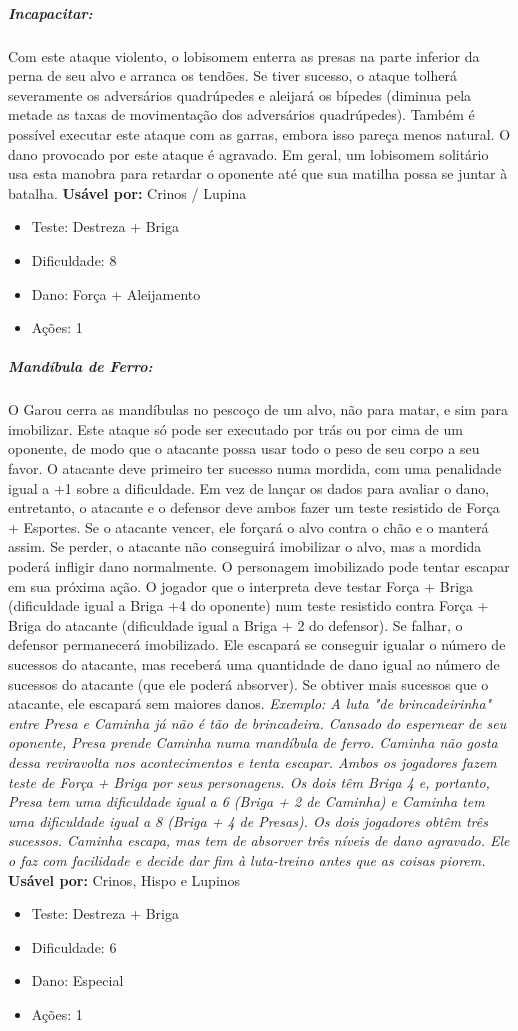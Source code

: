 \subparagraph{\bf Incapacitar:}
Com este ataque violento, o lobisomem enterra as presas na parte inferior da perna de seu alvo e arranca os tendões. Se tiver sucesso, o ataque tolherá severamente os adversários quadrúpedes e aleijará os bípedes (diminua pela metade as taxas de movimentação dos adversários quadrúpedes). Também é possível executar este ataque com as garras, embora isso pareça menos natural.
O dano provocado por este ataque é agravado. Em geral, um lobisomem solitário usa esta manobra para retardar o oponente até que sua matilha possa se juntar à batalha.
{\bf Usável por:} Crinos / Lupina
\begin{itemize}[noitemsep]
\item Teste: Destreza + Briga
\item Dificuldade: 8
\item Dano: Força + Aleijamento
\item Ações: 1
\end{itemize}

\subparagraph{\bf Mandíbula de Ferro:}
O Garou cerra as mandíbulas no pescoço de um alvo, não para matar, e sim para imobilizar. Este ataque só pode ser executado por trás ou por cima de um oponente, de modo que o atacante possa usar todo o peso de seu corpo a seu favor. O atacante deve primeiro ter sucesso numa mordida, com uma penalidade igual a +1 sobre a dificuldade. Em vez de lançar os dados para avaliar o dano, entretanto, o atacante e o defensor deve ambos fazer um teste resistido de Força + Esportes. Se o atacante vencer, ele forçará o alvo contra o chão e o manterá assim. Se perder, o atacante não conseguirá imobilizar o alvo, mas a mordida poderá infligir dano normalmente.
O personagem imobilizado pode tentar escapar em sua próxima ação. O jogador que o interpreta deve testar Força + Briga (dificuldade igual a Briga +4 do oponente) num teste resistido contra Força + Briga do atacante (dificuldade igual a Briga + 2 do defensor). Se falhar, o defensor permanecerá imobilizado. Ele escapará se conseguir igualar o número de sucessos do atacante, mas receberá uma quantidade de dano igual ao número de sucessos do atacante (que ele poderá absorver). Se obtiver mais sucessos que o atacante, ele escapará sem maiores danos.
{\it Exemplo: A luta "de brincadeirinha" entre Presa e Caminha já não é tão de brincadeira. Cansado do espernear de seu oponente, Presa prende Caminha numa mandíbula de ferro. Caminha não gosta dessa reviravolta nos acontecimentos e tenta escapar. Ambos os jogadores fazem teste de Força + Briga por seus personagens. Os dois têm Briga 4 e, portanto, Presa tem uma dificuldade igual a 6 (Briga + 2 de Caminha) e Caminha tem uma dificuldade igual a 8 (Briga + 4 de Presas). Os dois jogadores obtêm três sucessos. Caminha escapa, mas tem de absorver três níveis de dano agravado. Ele o faz com facilidade e decide dar fim à luta-treino antes que as coisas piorem.}
{\bf Usável por:} Crinos, Hispo e Lupinos
\begin{itemize}[noitemsep]
\item Teste: Destreza + Briga
\item Dificuldade: 6
\item Dano: Especial
\item Ações: 1
\end{itemize}

